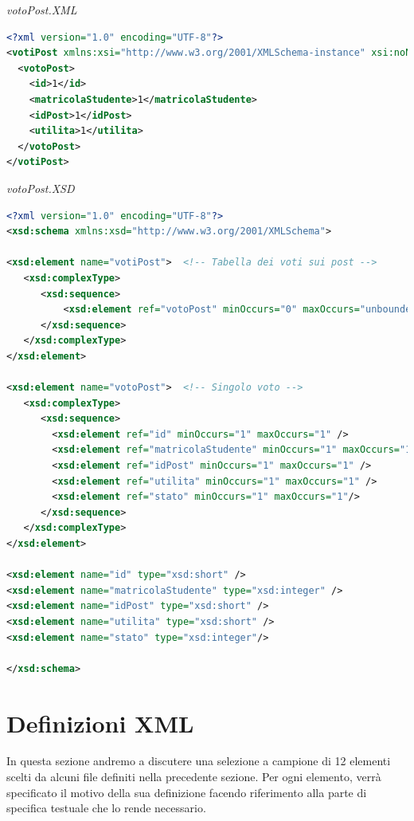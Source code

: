 \documentclass [a4paper,11pt]{book}
\begin{document}
\medskip

\emph{votoPost.XML}

\label{sec:votoPost}

\begin{lstlisting}[language=XML]
<?xml version="1.0" encoding="UTF-8"?>
<votiPost xmlns:xsi="http://www.w3.org/2001/XMLSchema-instance" xsi:noNamespaceSchemaLocation="votoPost.xsd">
  <votoPost>
    <id>1</id>
    <matricolaStudente>1</matricolaStudente>
    <idPost>1</idPost>
    <utilita>1</utilita>
  </votoPost>
</votiPost>
\end{lstlisting}

\emph{votoPost.XSD}

\begin{lstlisting}[language=XML]
<?xml version="1.0" encoding="UTF-8"?>
<xsd:schema xmlns:xsd="http://www.w3.org/2001/XMLSchema">

<xsd:element name="votiPost">  <!-- Tabella dei voti sui post -->
   <xsd:complexType> 
      <xsd:sequence>
	      <xsd:element ref="votoPost" minOccurs="0" maxOccurs="unbounded" />
      </xsd:sequence>
   </xsd:complexType>
</xsd:element>

<xsd:element name="votoPost">  <!-- Singolo voto -->
   <xsd:complexType> 
      <xsd:sequence>
        <xsd:element ref="id" minOccurs="1" maxOccurs="1" /> 
        <xsd:element ref="matricolaStudente" minOccurs="1" maxOccurs="1" />
        <xsd:element ref="idPost" minOccurs="1" maxOccurs="1" /> 
        <xsd:element ref="utilita" minOccurs="1" maxOccurs="1" /> 
        <xsd:element ref="stato" minOccurs="1" maxOccurs="1"/>
      </xsd:sequence>
   </xsd:complexType>
</xsd:element>

<xsd:element name="id" type="xsd:short" />
<xsd:element name="matricolaStudente" type="xsd:integer" />
<xsd:element name="idPost" type="xsd:short" />
<xsd:element name="utilita" type="xsd:short" />
<xsd:element name="stato" type="xsd:integer"/>

</xsd:schema>
\end{lstlisting}

\medskip

\section{Definizioni XML}	%

In questa sezione andremo a discutere una selezione a campione di 12 elementi scelti da alcuni file definiti nella precedente sezione. Per ogni elemento, verrà specificato il motivo della sua definizione facendo riferimento alla parte di specifica testuale che lo rende necessario.
\end{document}
